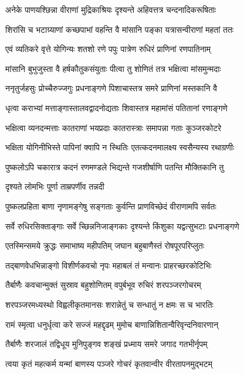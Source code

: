 \twolineshloka
{अनेके पाणयश्छिन्ना वीराणां मुद्रिकाश्रियः}
{दृश्यन्ते अहिवत्तत्र चन्दनादिकरूषिताः}%

\twolineshloka
{शिरांसि च भटाग्र्याणां कच्छपाभां वहन्ति वै}
{मांसानि पङ्का यत्रासन्वीराणां महतां ततः}%

\twolineshloka
{एवं व्यतिकरे वृत्ते योगिन्यः शतशो रणे}
{पपुः पात्रेण रुधिरं प्राणिनां रणपातिनाम्}%

\twolineshloka
{मांसानि बुभुजुस्ता वै हर्षकौतुकसंयुताः}
{पीत्वा तु शोणितं तत्र भक्षित्वा मांसमुन्मदाः}%

\twolineshloka
{ननृतुर्जहसुः प्रोच्चैरुज्जगुः प्रधनाङ्गणे}
{पिशाचास्तत्र समरे प्राणिनां मस्तकानि वै}%

\twolineshloka
{धृत्वा कराभ्यां मत्ताङ्गास्तालवद्वादनोद्यताः}
{शिवास्तत्र महामांसं पतितानां रणाङ्गणे}%

\twolineshloka
{भक्षित्वा व्यनदन्मत्ताः कातराणां भयप्रदाः}
{कातरास्त्राः समापन्ना गताः कुञ्जरकोटरे}%

\twolineshloka
{भक्षिता योगिनीभिस्ते पापिनां क्वापि न स्थितिः}
{एतत्कदनमालक्ष्य स्वसैन्यस्य रथाग्रणीः}%

\twolineshloka
{पुष्कलोऽपि चकारात्र कदनं रणमण्डले}
{भिद्यन्ते गजशीर्षाणि पतन्ति मौक्तिकानि तु}%

दृश्यते लोमभिः पूर्णा ताम्रपर्णीव तन्नदी

\twolineshloka
{पुष्कलप्रहिता बाणा नृणामङ्गेषु सङ्गताः}
{कुर्वन्ति प्राणविच्छेदं वीराणामपि सर्वतः}%

\twolineshloka
{सर्वे रुधिरसिक्ताङ्गाः सर्वे च्छिन्ननिजाङ्गकाः}
{दृश्यन्ते किंशुका यद्वत्सुभटाः प्रधनाङ्गणे}%

\twolineshloka
{एतस्मिन्समये क्रुद्धः समाभाष्य महीपतिम्}
{जघान बहुबाणैस्तं रोषपूरपरिप्लुतः}%

\twolineshloka
{तद्बाणवेधभिन्नाङ्गो विशीर्णकवचो नृपः}
{महाबलं तं मन्वानः प्राहरच्छरकोटिभिः}%

\twolineshloka
{तैर्बाणैः कवचान्मुक्तं सुस्राव बहुशोणितम्}
{वपुर्बभूव रुचिरं शरपञ्जरगोचरम्}%

\twolineshloka
{शरपञ्जरमध्यस्थो विह्वलीकृतमानसः}
{शरान्नेतुं च सन्धातुं न क्षमः स च भारतिः}%

\twolineshloka
{रामं स्मृत्वा धनुर्धृत्वा करे सज्जं महद्दृढम्}
{मुमोच बाणान्निशितान्वैरिवृन्दनिवारणान्}%

\twolineshloka
{तैर्बाणैः शरजालं तद्विधूय मुनिपुङ्गव}
{शङ्खं प्रध्माय समरे जगाद गतभीर्नृपम्}%


\twolineshloka
{त्वया कृतं महत्कर्म यन्मां बाणस्य पञ्जरे}
{गोचरं कृतवान्वीर वीरतापनमुद्भटम्}%

